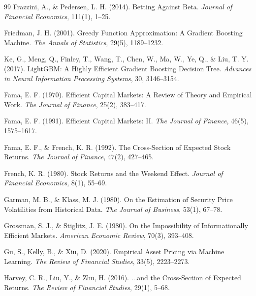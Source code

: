 \documentclass[11pt,a4paper]{article}
\begin{document}
\begin{thebibliography}{99}
Frazzini, A., \& Pedersen, L. H. (2014).
\newblock Betting Against Beta.
\newblock \textit{Journal of Financial Economics}, 111(1), 1--25.

Friedman, J. H. (2001).
\newblock Greedy Function Approximation: A Gradient Boosting Machine.
\newblock \textit{The Annals of Statistics}, 29(5), 1189--1232.

Ke, G., Meng, Q., Finley, T., Wang, T., Chen, W., Ma, W., Ye, Q., \& Liu, T. Y. (2017).
\newblock LightGBM: A Highly Efficient Gradient Boosting Decision Tree.
\newblock \textit{Advances in Neural Information Processing Systems}, 30, 3146--3154.

Fama, E. F. (1970).
\newblock Efficient Capital Markets: A Review of Theory and Empirical Work.
\newblock \textit{The Journal of Finance}, 25(2), 383--417.

Fama, E. F. (1991).
\newblock Efficient Capital Markets: II.
\newblock \textit{The Journal of Finance}, 46(5), 1575--1617.

Fama, E. F., \& French, K. R. (1992).
\newblock The Cross-Section of Expected Stock Returns.
\newblock \textit{The Journal of Finance}, 47(2), 427--465.

French, K. R. (1980).
\newblock Stock Returns and the Weekend Effect.
\newblock \textit{Journal of Financial Economics}, 8(1), 55--69.

Garman, M. B., \& Klass, M. J. (1980).
\newblock On the Estimation of Security Price Volatilities from Historical Data.
\newblock \textit{The Journal of Business}, 53(1), 67--78.

Grossman, S. J., \& Stiglitz, J. E. (1980).
\newblock On the Impossibility of Informationally Efficient Markets.
\newblock \textit{American Economic Review}, 70(3), 393--408.

Gu, S., Kelly, B., \& Xiu, D. (2020).
\newblock Empirical Asset Pricing via Machine Learning.
\newblock \textit{The Review of Financial Studies}, 33(5), 2223--2273.

Harvey, C. R., Liu, Y., \& Zhu, H. (2016).
\newblock ...and the Cross-Section of Expected Returns.
\newblock \textit{The Review of Financial Studies}, 29(1), 5--68.


\end{thebibliography}
\end{document}
